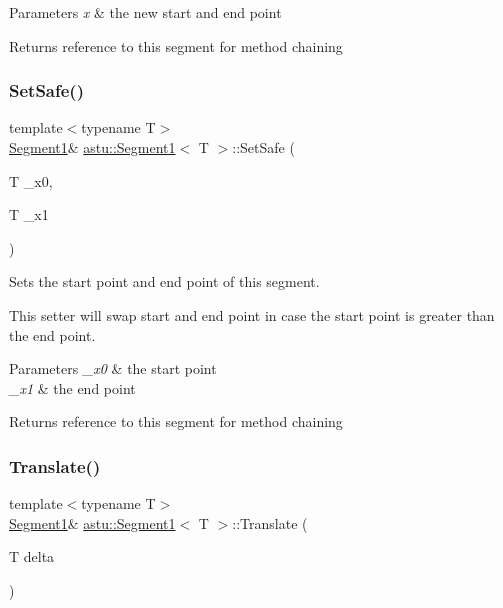 \begin{DoxyParams}{Parameters}
{\em x} & the new start and end point \\
\hline
\end{DoxyParams}
\begin{DoxyReturn}{Returns}
reference to this segment for method chaining 
\end{DoxyReturn}
\mbox{\label{classastu_1_1Segment1_abc994f244b4bdf33c979301af2559f84}} 
\subsubsection{\texorpdfstring{Set\+Safe()}{SetSafe()}}
{\footnotesize\ttfamily template$<$typename T$>$ \\
\hyperlink{classastu_1_1Segment1}{Segment1}\& \hyperlink{classastu_1_1Segment1}{astu\+::\+Segment1}$<$ T $>$\+::Set\+Safe (\begin{DoxyParamCaption}\item[{T}]{\+\_\+x0,  }\item[{T}]{\+\_\+x1 }\end{DoxyParamCaption})\hspace{0.3cm}{\ttfamily [inline]}}

Sets the start point and end point of this segment.

This setter will swap start and end point in case the start point is greater than the end point.


\begin{DoxyParams}{Parameters}
{\em \+\_\+x0} & the start point \\
\hline
{\em \+\_\+x1} & the end point \\
\hline
\end{DoxyParams}
\begin{DoxyReturn}{Returns}
reference to this segment for method chaining 
\end{DoxyReturn}
\mbox{\label{classastu_1_1Segment1_aff508149bdb4dc360d733903d01d396d}} 
\subsubsection{\texorpdfstring{Translate()}{Translate()}}
{\footnotesize\ttfamily template$<$typename T$>$ \\
\hyperlink{classastu_1_1Segment1}{Segment1}\& \hyperlink{classastu_1_1Segment1}{astu\+::\+Segment1}$<$ T $>$\+::Translate (\begin{DoxyParamCaption}\item[{T}]{delta }\end{DoxyParamCaption})\hspace{0.3cm}{\ttfamily [inline]}}

